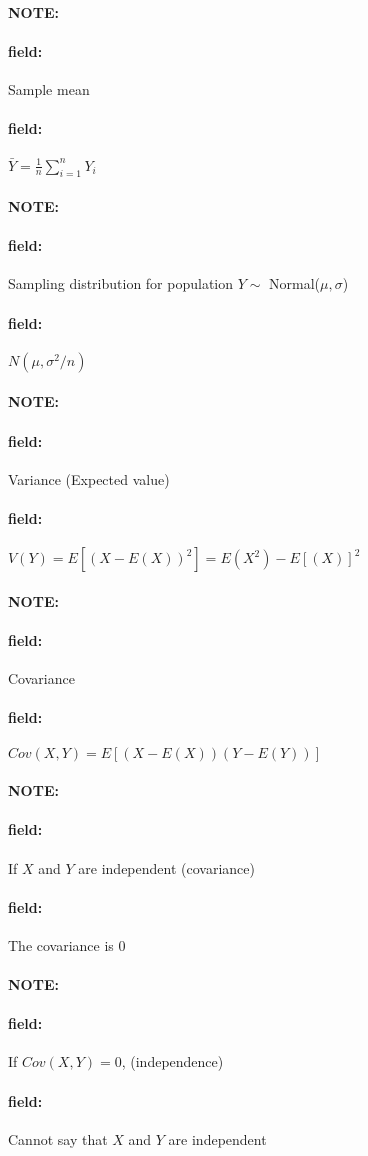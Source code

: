 \documentclass[12pt]{article}
\newenvironment{note}{\paragraph{NOTE:}}{}
\newenvironment{field}{\paragraph{field:}}{}
\begin{document}
\begin{note}
    \begin{field}
        Sample mean
    \end{field}
    \begin{field}
        $\bar{Y} = \frac{1}{n}\sum_{i=1}^n Y_i$
    \end{field}
\end{note}

\begin{note}
    \begin{field}
        Sampling distribution for population $Y \sim $ Normal($\mu,\sigma$)
    \end{field}
    \begin{field}
        $N(\mu,\sigma^2/n)$
    \end{field}
\end{note}

\begin{note}
    \begin{field}
        Variance (Expected value)
    \end{field}
    \begin{field}
        $V(Y) = E[(X - E(X))^2] = E(X^2) - E[(X)]^2$
    \end{field}
\end{note}

\begin{note}
    \begin{field}
        Covariance
    \end{field}
    \begin{field}
        $Cov(X,Y) = E[(X - E(X))(Y - E(Y))]$
    \end{field}
\end{note}

\begin{note}
    \begin{field}
        If $X$ and $Y$ are independent (covariance)
    \end{field}
    \begin{field}
        The covariance is 0
    \end{field}
\end{note}

\begin{note}
    \begin{field}
        If $Cov(X,Y) = 0$, (independence)
    \end{field}
    \begin{field}
        Cannot say that $X$ and $Y$ are independent
    \end{field}
\end{note}
\end{document}
